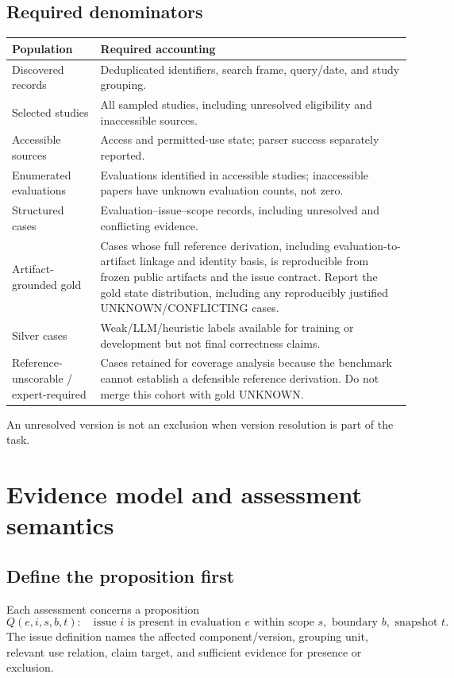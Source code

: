 \documentclass[11pt,a4paper]{article}
\newcommand{\status}[1]{\textsf{\small #1}}
\begin{document}
\subsection{Required denominators}
\begin{tabularx}{\linewidth}{@{}L{31mm}Y@{}}
\toprule
\textbf{Population} & \textbf{Required accounting}\\ \midrule
Discovered records & Deduplicated identifiers, search frame, query/date, and study grouping.\\
Selected studies & All sampled studies, including unresolved eligibility and inaccessible sources.\\
Accessible sources & Access and permitted-use state; parser success separately reported.\\
Enumerated evaluations & Evaluations identified in accessible studies; inaccessible papers have unknown evaluation counts, not zero.\\
Structured cases & Evaluation--issue--scope records, including unresolved and conflicting evidence.\\
Artifact-grounded gold & Cases whose full reference derivation, including evaluation-to-artifact linkage and identity basis, is reproducible from frozen public artifacts and the issue contract. Report the gold state distribution, including any reproducibly justified \status{UNKNOWN}/\status{CONFLICTING} cases.\\
Silver cases & Weak/LLM/heuristic labels available for training or development but not final correctness claims.\\
Reference-unscorable / expert-required & Cases retained for coverage analysis because the benchmark cannot establish a defensible reference derivation. Do not merge this cohort with gold \status{UNKNOWN}.\\
\bottomrule
\end{tabularx}

An unresolved version is not an exclusion when version resolution is part of the task.

\section{Evidence model and assessment semantics}
\label{sec:evidence}
\subsection{Define the proposition first}
Each assessment concerns a proposition
\[
Q(e,i,s,b,t):\quad \text{issue } i \text{ is present in evaluation } e
\text{ within scope } s,\text{ boundary } b,\text{ snapshot } t.
\]
The issue definition names the affected component/version, grouping unit, relevant use relation, claim target, and sufficient evidence for presence or exclusion.
\end{document}
